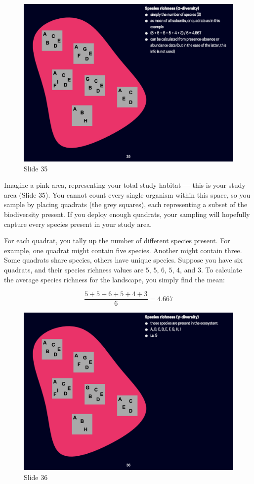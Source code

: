 \documentclass[
  10pt,
]{book}
\begin{document}
\begin{figure}[ht]
\centering
\includegraphics[width=0.8\linewidth]{../images/BDC334/BDC334-035.jpeg}
\caption*{Slide 35}
\end{figure}

Imagine a pink area, representing your total study habitat --- this is
your study area (Slide 35). You cannot count every single organism
within this space, so you sample by placing quadrats (the grey squares),
each representing a subset of the biodiversity present. If you deploy
enough quadrats, your sampling will hopefully capture every species
present in your study area.

For each quadrat, you tally up the number of different species present.
For example, one quadrat might contain five species. Another might
contain three. Some quadrats share species, others have unique species.
Suppose you have six quadrats, and their species richness values are
\(5\), \(5\), \(6\), \(5\), \(4\), and \(3\). To calculate the average
species richness for the landscape, you simply find the mean:

\[
\frac{5 + 5 + 6 + 5 + 4 + 3}{6} = 4.667
\]

\begin{figure}[ht]
\centering
\includegraphics[width=0.8\linewidth]{../images/BDC334/BDC334-036.jpeg}
\caption*{Slide 36}
\end{figure}
\end{document}

